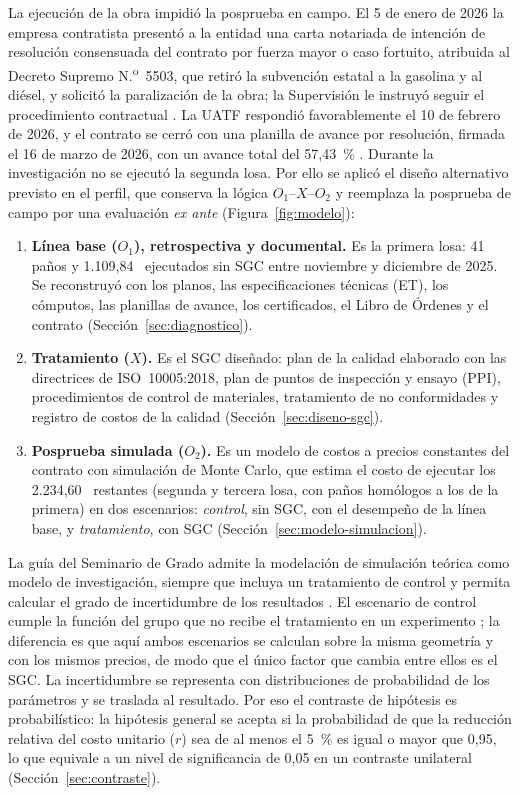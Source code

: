 La ejecución de la obra impidió la posprueba en campo. El 5 de enero de 2026 la empresa contratista presentó a la entidad una carta notariada de intención de resolución consensuada del contrato por fuerza mayor o caso fortuito, atribuida al Decreto Supremo N.\textsuperscript{o}~5503, que retiró la subvención estatal a la gasolina y al diésel, y solicitó la paralización de la obra; la Supervisión le instruyó seguir el procedimiento contractual \parencite[pp.~1, 14]{uatf_item13}. La UATF respondió favorablemente el 10 de febrero de 2026, y el contrato se cerró con una planilla de avance por resolución, firmada el 16 de marzo de 2026, con un avance total del 57,43~\% \parencite[pp.~1--2]{uatf_item13}. Durante la investigación no se ejecutó la segunda losa. Por ello se aplicó el diseño alternativo previsto en el perfil, que conserva la lógica $O_1$--$X$--$O_2$ y reemplaza la posprueba de campo por una evaluación \emph{ex ante} (Figura~\ref{fig:modelo}):

\begin{enumerate}
  \item \textbf{Línea base ($O_1$), retrospectiva y documental.} Es la primera losa: 41 paños y 1.109,84~\mdos{} ejecutados sin SGC entre noviembre y diciembre de 2025. Se reconstruyó con los planos, las especificaciones técnicas (ET), los cómputos, las planillas de avance, los certificados, el Libro de Órdenes y el contrato (Sección~\ref{sec:diagnostico}).
  \item \textbf{Tratamiento ($X$).} Es el SGC diseñado: plan de la calidad elaborado con las directrices de ISO~10005:2018, plan de puntos de inspección y ensayo (PPI), procedimientos de control de materiales, tratamiento de no conformidades y registro de costos de la calidad (Sección~\ref{sec:diseno-sgc}).
  \item \textbf{Posprueba simulada ($O_2$).} Es un modelo de costos a precios constantes del contrato con simulación de Monte Carlo, que estima el costo de ejecutar los 2.234,60~\mdos{} restantes (segunda y tercera losa, con paños homólogos a los de la primera) en dos escenarios: \emph{control}, sin SGC, con el desempeño de la línea base, y \emph{tratamiento}, con SGC (Sección~\ref{sec:modelo-simulacion}).
\end{enumerate}

La guía del Seminario de Grado admite la modelación de simulación teórica como modelo de investigación, siempre que incluya un tratamiento de control y permita calcular el grado de incertidumbre de los resultados \parencite{barrios2021modelo}. El escenario de control cumple la función del grupo que no recibe el tratamiento en un experimento \parencite[p.~154]{hernandez2018}; la diferencia es que aquí ambos escenarios se calculan sobre la misma geometría y con los mismos precios, de modo que el único factor que cambia entre ellos es el SGC. La incertidumbre se representa con distribuciones de probabilidad de los parámetros y se traslada al resultado. Por eso el contraste de hipótesis es probabilístico: la hipótesis general se acepta si la probabilidad de que la reducción relativa del costo unitario ($r$) sea de al menos el 5~\% es igual o mayor que 0,95, lo que equivale a un nivel de significancia de 0,05 en un contraste unilateral (Sección~\ref{sec:contraste}).

